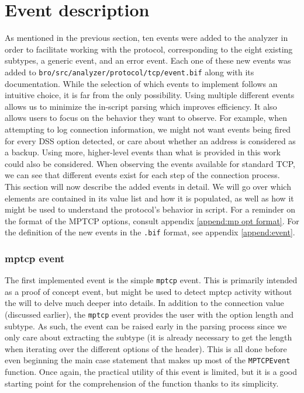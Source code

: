 \section{Event description}
As mentioned in the previous section, ten events were added to the analyzer in order to facilitate working with the protocol, corresponding to the eight existing subtypes, a generic event, and an error event. Each one of these new events was added to \texttt{bro/src/analyzer/protocol/tcp/event.bif} along with its documentation. While the selection of which events to implement follows an intuitive choice, it is far from the only possibility. Using multiple different events allows us to minimize the in-script parsing which improves efficiency. It also allows users to focus on the behavior they want to observe. For example, when attempting to log connection information, we might not want events being fired for every DSS option detected, or care about whether an address is considered as a backup. Using more, higher-level events than what is provided in this work could also be considered. When observing the events available for standard TCP, we can see that different events exist for each step of the connection process. \\

This section will now describe the added events in detail. We will go over which elements are contained in its value list and how it is populated, as well as how it might be used to understand the protocol's behavior in script. For a reminder on the format of the MPTCP options, consult appendix \ref{append:mp opt format}. For the definition of the new events in the \texttt{.bif} format, see appendix \ref{append:event}.

\subsubsection{mptcp event}
The first implemented event is the simple \texttt{mptcp} event. This is primarily intended as a proof of concept event, but might be used to detect mptcp activity without the will to delve much deeper into details. In addition to the connection value (discussed earlier), the \texttt{mptcp} event provides the user with the option length and subtype. As such, the event can be raised early in the parsing process since we only care about extracting the subtype (it is already necessary to get the length when iterating over the different options of the header). This is all done before even beginning the main case statement that makes up most of the \texttt{MPTCPEvent} function. Once again, the practical utility of this event is limited, but it is a good starting point for the comprehension of the function thanks to its simplicity. \\

